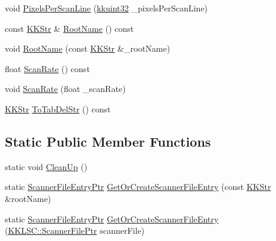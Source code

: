 \begin{DoxyCompactItemize}
\item 
void \hyperlink{class_k_k_l_s_c_1_1_scanner_file_entry_afe5b6ec613ef0f348af0a3002eb43cc1}{Pixels\+Per\+Scan\+Line} (\hyperlink{namespace_k_k_b_af8d832f05c54994a1cce25bd5743e19a}{kkuint32} \+\_\+pixels\+Per\+Scan\+Line)
\item 
const \hyperlink{class_k_k_b_1_1_k_k_str}{K\+K\+Str} \& \hyperlink{class_k_k_l_s_c_1_1_scanner_file_entry_a6ccefa48fcd3f9c7afe89a5e47765b9b}{Root\+Name} () const 
\item 
void \hyperlink{class_k_k_l_s_c_1_1_scanner_file_entry_aabc8f6ab8a36169b84db7743d382d582}{Root\+Name} (const \hyperlink{class_k_k_b_1_1_k_k_str}{K\+K\+Str} \&\+\_\+root\+Name)
\item 
float \hyperlink{class_k_k_l_s_c_1_1_scanner_file_entry_a6dc3cedc55812a7dc5e102e91752c25d}{Scan\+Rate} () const 
\item 
void \hyperlink{class_k_k_l_s_c_1_1_scanner_file_entry_a3027291c676a1ef5056a6281d520c803}{Scan\+Rate} (float \+\_\+scan\+Rate)
\item 
\hyperlink{class_k_k_b_1_1_k_k_str}{K\+K\+Str} \hyperlink{class_k_k_l_s_c_1_1_scanner_file_entry_afa83264ed9460f827ff3ec7a6326cb4d}{To\+Tab\+Del\+Str} () const 
\end{DoxyCompactItemize}
\subsection*{Static Public Member Functions}
\begin{DoxyCompactItemize}
\item 
static void \hyperlink{class_k_k_l_s_c_1_1_scanner_file_entry_adde202e21a7097e9f571d9793e0e4c69}{Clean\+Up} ()
\item 
static \hyperlink{class_k_k_l_s_c_1_1_scanner_file_entry_a5527b55d7c937f3d6eddfdbadedb3839}{Scanner\+File\+Entry\+Ptr} \hyperlink{class_k_k_l_s_c_1_1_scanner_file_entry_a150a635fa02fe996086b792cb5e6c6a0}{Get\+Or\+Create\+Scanner\+File\+Entry} (const \hyperlink{class_k_k_b_1_1_k_k_str}{K\+K\+Str} \&root\+Name)
\item 
static \hyperlink{class_k_k_l_s_c_1_1_scanner_file_entry_a5527b55d7c937f3d6eddfdbadedb3839}{Scanner\+File\+Entry\+Ptr} \hyperlink{class_k_k_l_s_c_1_1_scanner_file_entry_a608752eb8016067d28bff4e26f796669}{Get\+Or\+Create\+Scanner\+File\+Entry} (\hyperlink{namespace_k_k_l_s_c_ad33f47f76479d7fb0fc90d06fa34b581}{K\+K\+L\+S\+C\+::\+Scanner\+File\+Ptr} scanner\+File)
\end{DoxyCompactItemize}


